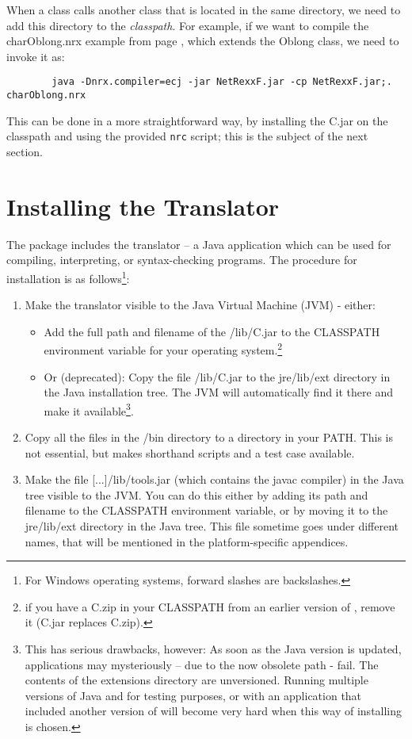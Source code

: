 When a class calls another class that is located in the same
directory, we need to add this directory to the \emph{classpath}. For
example, if we want to compile the charOblong.nrx example from page
\pageref{charoblong}, which extends the Oblong class, we need to
invoke it as:
 \begin{verbatim}
        java -Dnrx.compiler=ecj -jar NetRexxF.jar -cp NetRexxF.jar;. charOblong.nrx
\end{verbatim}
This can be done in a more straightforward way, by installing the
\nr{}C.jar on the classpath and using the provided \texttt{nrc}
script; this is the subject of the next section.

\section{Installing the \nr{} Translator}
The \nr{} package includes the \nr{} translator – a Java application which can be used for compiling, interpreting, or syntax-checking \nr{} programs. The procedure for installation is as follows\footnote{For Windows operating systems, forward slashes are backslashes.}:
\begin{enumerate}
\item Make the translator visible to the Java Virtual Machine (JVM) - either:
\begin{itemize} 
\item Add the full path and filename of the \nr{}/lib/\nr{}C.jar to the CLASSPATH environment variable for your operating system.\footnote{if you have a \nr{}C.zip in your CLASSPATH from an earlier version of \nr{}, remove it (\nr{}C.jar replaces \nr{}C.zip).}
\item Or (deprecated): Copy the file \nr{}/lib/\nr{}C.jar to the jre/lib/ext directory in the Java installation tree. The JVM will automatically find it there and make it available\footnote{ This has serious drawbacks, however:
As soon as the Java version is updated, \nr{} applications may
mysteriously – due to the now obsolete path - fail. The contents of
the extensions directory are unversioned.
Running multiple versions of Java and \nr{} for testing purposes, or
with an application that included another version of \nr{} will become very hard when this way of installing is chosen.}.
\end{itemize}
\item Copy all the files in the \nr{}/bin directory to a directory in your PATH. This is not essential, but makes shorthand scripts and a test case available. 
\item Make the file [...]/lib/tools.jar (which contains the javac compiler) in the Java tree visible to the JVM. You can do this either by adding its path and filename to the CLASSPATH environment variable, or by moving it to the jre/lib/ext directory in the Java tree. This file sometime goes under different names, that will be mentioned in the platform-specific appendices.
\end{enumerate}
